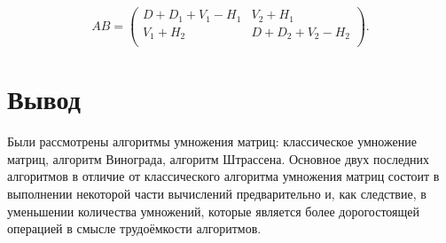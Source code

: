 \begin{equation}
	AB = \left(
	\begin{array}{cc}
		D+D_1+V_1-H_1 & V_2+H_1\\
		V_1 + H_2 & D+D_2+V_2-H_2 \\
	\end{array}
	\right).
\end{equation}

\section*{Вывод}

Были рассмотрены алгоритмы умножения матриц: классическое умножение матриц, алгоритм Винограда, алгоритм Штрассена. Основное двух последних алгоритмов в отличие от классического алгоритма умножения матриц состоит в выполнении некоторой части вычислений предварительно и, как следствие, в уменьшении количества умножений, которые является более дорогостоящей операцией в смысле трудоёмкости алгоритмов.

\pagebreak

